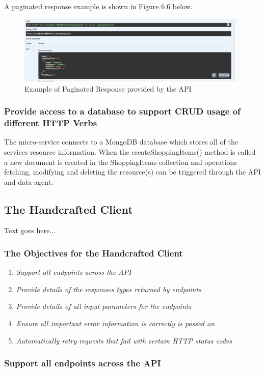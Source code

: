 A paginated response example is shown in Figure 6.6 below.
\begin{figure}[!htb]
    \caption{Example of Paginated Response provided by the API}
\centering
\includegraphics[scale=0.4]{FYP_Dissertation_template/Figures/pagination-example.PNG}
\end{figure}
\FloatBarrier
\subsubsection{Provide access to a database to support CRUD usage of different HTTP Verbs}
The micro-service connects to a MongoDB database which stores all of the services resource information. When the createShoppingItems() method is called a new document is created in the ShoppingItems collection and operations fetching, modifying and deleting the resource(s) can be triggered through the API and data-agent.
\subsection{The Handcrafted Client}
Text goes here...
\subsubsection{The Objectives for the Handcrafted Client}
\begin{enumerate}
    \item \textit{Support all endpoints across the API}
    \item \textit{Provide details of the responses types returned by endpoints}
    \item \textit{Provide details of all input parameters for the endpoints}
    \item \textit{Ensure all important error information is correctly is passed on}
    \item \textit{Automatically retry requests that fail with certain HTTP status codes}
\end{enumerate}
\subsubsection{Support all endpoints across the API}
